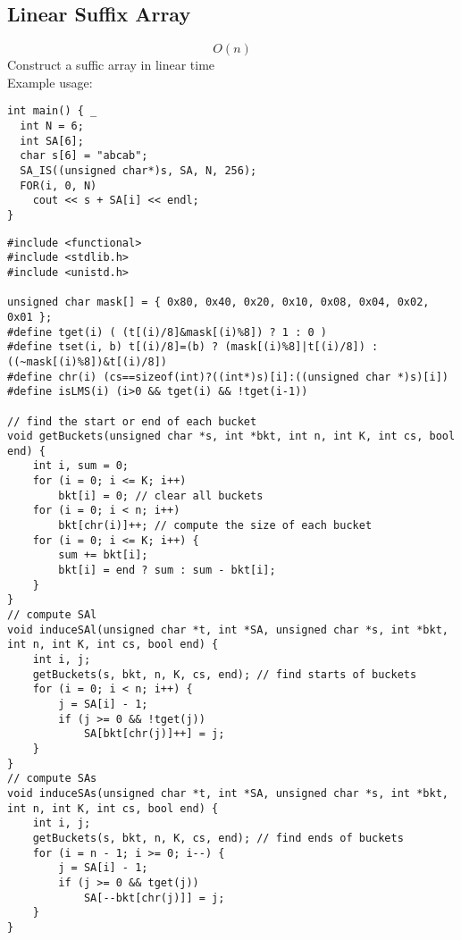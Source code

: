 \documentclass[11pt, oneside]{article}
\begin{document}
\subsection{Linear Suffix Array}
\[O(n)\]
Construct a suffic array in linear time\\
Example usage:
\begin{lstlisting}
int main() { _
  int N = 6;
  int SA[6];
  char s[6] = "abcab";
  SA_IS((unsigned char*)s, SA, N, 256);
  FOR(i, 0, N)
    cout << s + SA[i] << endl;
}
\end{lstlisting}
\begin{lstlisting}
#include <functional>
#include <stdlib.h>
#include <unistd.h>

unsigned char mask[] = { 0x80, 0x40, 0x20, 0x10, 0x08, 0x04, 0x02, 0x01 };
#define tget(i) ( (t[(i)/8]&mask[(i)%8]) ? 1 : 0 )
#define tset(i, b) t[(i)/8]=(b) ? (mask[(i)%8]|t[(i)/8]) : ((~mask[(i)%8])&t[(i)/8])
#define chr(i) (cs==sizeof(int)?((int*)s)[i]:((unsigned char *)s)[i])
#define isLMS(i) (i>0 && tget(i) && !tget(i-1))

// find the start or end of each bucket
void getBuckets(unsigned char *s, int *bkt, int n, int K, int cs, bool end) {
    int i, sum = 0;
    for (i = 0; i <= K; i++)
        bkt[i] = 0; // clear all buckets
    for (i = 0; i < n; i++)
        bkt[chr(i)]++; // compute the size of each bucket
    for (i = 0; i <= K; i++) {
        sum += bkt[i];
        bkt[i] = end ? sum : sum - bkt[i];
    }
}
// compute SAl
void induceSAl(unsigned char *t, int *SA, unsigned char *s, int *bkt, int n, int K, int cs, bool end) {
    int i, j;
    getBuckets(s, bkt, n, K, cs, end); // find starts of buckets
    for (i = 0; i < n; i++) {
        j = SA[i] - 1;
        if (j >= 0 && !tget(j))
            SA[bkt[chr(j)]++] = j;
    }
}
// compute SAs
void induceSAs(unsigned char *t, int *SA, unsigned char *s, int *bkt, int n, int K, int cs, bool end) {
    int i, j;
    getBuckets(s, bkt, n, K, cs, end); // find ends of buckets
    for (i = n - 1; i >= 0; i--) {
        j = SA[i] - 1;
        if (j >= 0 && tget(j))
            SA[--bkt[chr(j)]] = j;
    }
}


\end{lstlisting}
\end{document}
